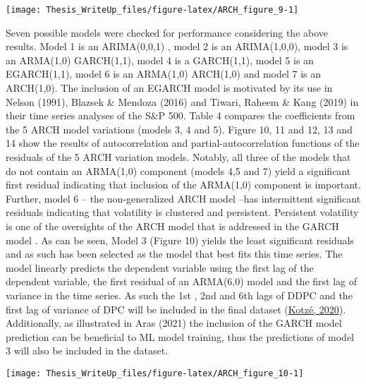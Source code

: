 \documentclass[11pt,preprint, authoryear]{elsarticle}
\let\origfigure\figure
\let\endorigfigure\endfigure
\renewenvironment{figure}[1][2] {
    \expandafter\origfigure\expandafter[H]
} {
    \endorigfigure
}
\numberwithin{equation}{section}
\numberwithin{figure}{section}
\numberwithin{table}{section}
\begin{document}
\begin{figure}[H]

{\centering \texttt{[image: Thesis\_WriteUp\_files/figure-latex/ARCH\_figure\_9-1]} 

}

\caption{Autocorrelation and partial-autocorrelation functions of absolute LogDiff \label{Figure9}}\label{fig:ARCH_figure_9}
\end{figure}

Seven possible models were checked for performance considering the above
results. Model 1 is an ARIMA(0,0,1) , model 2 is an ARIMA(1,0,0), model
3 is an ARMA(1,0) GARCH(1,1), model 4 is a GARCH(1,1), model 5 is an
EGARCH(1,1), model 6 is an ARMA(1,0) ARCH(1,0) and model 7 is an
ARCH(1,0). The inclusion of an EGARCH model is motivated by its use in
Nelson (1991), Blazsek \& Mendoza (2016) and Tiwari, Raheem \& Kang
(2019) in their time series analyses of the S\&P 500. Table 4 compares
the coefficients from the 5 ARCH model variations (models 3, 4 and 5).
Figure 10, 11 and 12, 13 and 14 show the results of autocorrelation and
partial-autocorrelation functions of the residuals of the 5 ARCH
variation models. Notably, all three of the models that do not contain
an ARMA(1,0) component (models 4,5 and 7) yield a significant first
residual indicating that inclusion of the ARMA(1,0) component is
important. Further, model 6 -- the non-generalized ARCH model --has
intermittent significant residuals indicating that volatility is
clustered and persistent. Persistent volatility is one of the oversights
of the ARCH model that is addressed in the GARCH model . As can be seen,
Model 3 (Figure 10) yields the least significant residuals and as such
has been selected as the model that best fits this time series. The
model linearly predicts the dependent variable using the first lag of
the dependent variable, the first residual of an ARMA(6,0) model and the
first lag of variance in the time series. As such the 1st , 2nd and 6th
lags of DDPC and the first lag of variance of DPC will be included in
the final dataset (\protect\hyperlink{ref-kotze2020univariate}{Kotzé,
2020}). Additionally, as illustrated in Aras (2021) the inclusion of the
GARCH model prediction can be beneficial to ML model training, thus the
predictions of model 3 will also be included in the dataset.

\begin{figure}[H]

{\centering \texttt{[image: Thesis\_WriteUp\_files/figure-latex/ARCH\_figure\_10-1]} 

}

\caption{Autocorrelation and partial-autocorrelation functions of model 3 residuals \label{Figure9}}\label{fig:ARCH_figure_10}
\end{figure}
\end{document}
